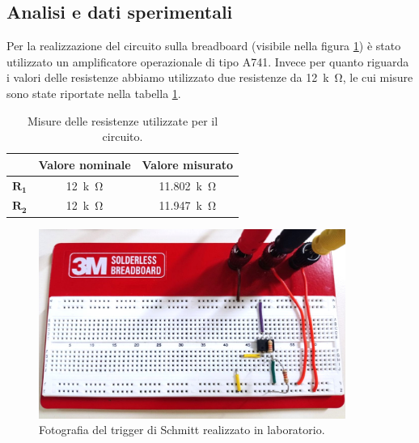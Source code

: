 \documentclass{report}
\begin{document}
\subsection{Analisi e dati sperimentali}
Per la realizzazione del circuito sulla breadboard (visibile nella figura \ref{figura:circuito2}) è stato utilizzato un amplificatore operazionale di tipo \textmu A741.
Invece per quanto riguarda i valori delle resistenze abbiamo utilizzato due resistenze da \SI{12}{k\ohm}, le cui misure sono state riportate nella tabella \ref{table:mis_res2}.
\begin{table}[h!]
	\centering
	\begin{tabular}{|c|c|c|}
		\cline{2-3} 
		\multicolumn{1}{c|}{} & \textbf{Valore nominale} & \textbf{Valore misurato}\\ 
		\hline
		$\mathbf{R_1}$ & \SI{12}{k\ohm} & \SI{11.802}{k\ohm} \\ 
		\hline
		$\mathbf{R_2}$ & \SI{12}{k\ohm} & \SI{11.947}{k\ohm} \\ 
		\hline
	\end{tabular}
	\caption{Misure delle resistenze utilizzate per il circuito.}
	\label{table:mis_res2}
\end{table}
\begin{figure}[h]
	\centering
	\includegraphics[height=6.2cm]{immagini/circuito2}
	\caption{Fotografia del trigger di Schmitt realizzato in laboratorio.}
	\label{figura:circuito2}
\end{figure}
\end{document}
